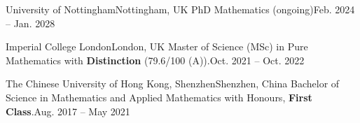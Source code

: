 \HeadingItemListStart
	\HeadingItem
		{University of Nottingham}{Nottingham, UK}
		{PhD Mathematics (ongoing)}{Feb. 2024 -- Jan. 2028}
		\ItemListStart
		\ItemListEnd

	\HeadingItem
		{Imperial College London}{London, UK}
		{Master of Science (MSc) in Pure Mathematics with \textbf{Distinction} (79.6/100 (A)).}{Oct. 2021 -- Oct. 2022}
		\ItemListStart
		\ItemListEnd

	\HeadingItem
		{The Chinese University of Hong Kong, Shenzhen}{Shenzhen, China}
		{Bachelor of Science in Mathematics and Applied Mathematics with Honours, \textbf{First Class}.}{Aug. 2017 -- May 2021}



\HeadingItemListEnd